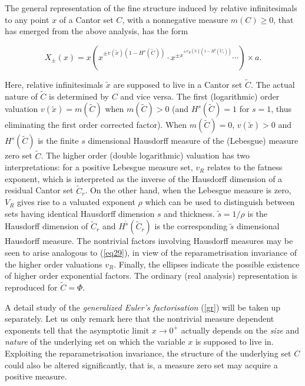 \documentclass[12pt]{article}
\begin{document}
The general representation of the fine structure induced by relative infinitesimals to any point $x$ of a Cantor set $C$, with a nonnegative measure $m( C)\geq 0$, that has emerged from the above analysis, has the form 

\begin{equation}\label{gr}
X_{\pm}(x)=x\left( x^{\pm v(\tilde x)(1-H^s(\tilde C))}\cdot x^{\pm x^{\pm v_R(\tilde x)(1-H^{{\tilde s}}(\tilde C_r))}}\cdots\right )\times a.
\end{equation}

\noindent Here, relative infinitesimals $\tilde x$ are supposed to live in a Cantor set $\tilde C$. The actual nature of $\tilde C$ is determined by $C$ and vice versa. The first (logarithmic) order valuation $v(\tilde x)=m(\tilde C)$ when $m(\tilde C)>0$ (and $H^s(\tilde C)=1$ for $s=1$, thus eliminating the first order corrected factor). When $m(\tilde C)=0$, $v(\tilde x)>0$ and $H^s(\tilde C)$ is the finite $s$ dimensional Hausdorff measure of the (Lebesgue) measure zero set $\tilde C$. The higher order (double logarithmic) valuation has two interpretations: for a positive Lebesgue measure  set, $v_R$ relates to the fatness exponent, which is interpreted as the inverse of the Hausdorff dimension of a residual Cantor set $\tilde C_r$. On the other hand, when the Lebesgue measure is zero, $V_R$ gives rise to a valuated exponent $\rho$ which can be used to distinguish between sets having identical Hausdorff dimension $s$ and thickness. $\tilde s=1/\rho$ is the Hausdorff dimension of $ \tilde C_r$ and $H^{\tilde s}(\tilde C_r)$ is the corresponding  $\tilde s$ dimensional Hausdorff measure. The nontrivial factors involving Hausdorff measures may be seen to arise analogous to (\ref{eq29}), in view of the reparametrisation invariance of the higher order valuations $v_R$. Finally, the ellipses indicate the possible existence of higher order exponential factors. The ordinary (real analysis) representation is reproduced for $\tilde C=\Phi$.

A detail study of the {\em generalized Euler's factorisation } (\ref{gr}) will be taken up separately. Let us  only remark here that the nontrivial measure dependent exponents tell that the asymptotic limit $x\rightarrow 0^+$ actually depends on the {\em size} and {\em nature} of the underlying set on which the variable $x$  is supposed to live in. Exploiting the reparametrisation invariance, the structure of the underlying set $C$ could also be altered significantly, that is, a measure zero set may acquire a positive measure.
\end{document}

